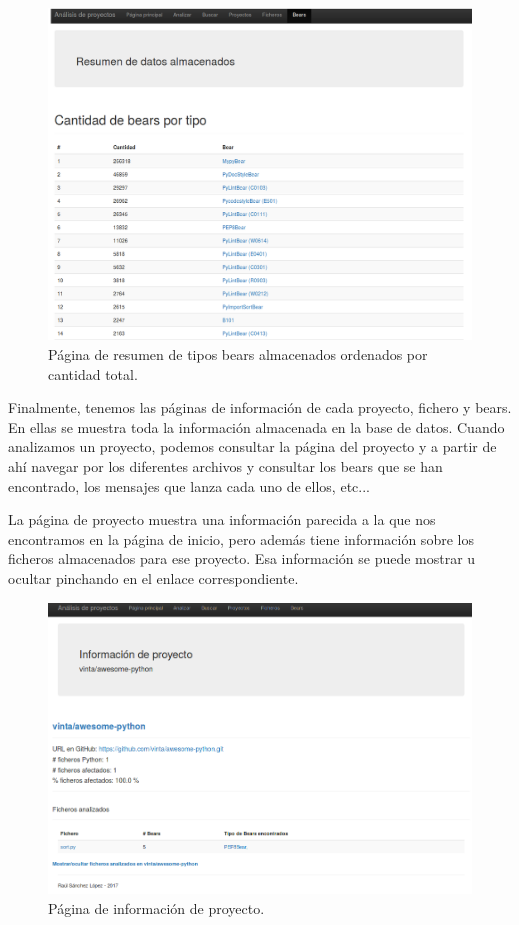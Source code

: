\documentclass[a4paper, 12pt]{book}
\begin{document}
\begin{figure}[h]
  \centering
  \includegraphics[width=12cm, keepaspectratio]{img/resumenBears}
  \caption{Página de resumen de tipos bears almacenados ordenados por cantidad total.}
  \label{fig:resumenBears}
\end{figure}
Finalmente, tenemos las páginas de información de cada proyecto, fichero y bears. En ellas se muestra toda la información almacenada en la base de datos. Cuando analizamos un proyecto, podemos consultar la página del proyecto y a partir de ahí navegar por los diferentes archivos y consultar los bears que se han encontrado, los mensajes que lanza cada uno de ellos, etc...

La página de proyecto muestra una información parecida a la que nos encontramos en la página de inicio, pero además tiene información sobre los ficheros almacenados para ese proyecto. Esa información se puede mostrar u ocultar pinchando en el enlace correspondiente.
\begin{figure}[h]
  \centering
  \includegraphics[width=12cm, keepaspectratio]{img/infoProyecto}
  \caption{Página de información de proyecto.}
  \label{fig:infoProyecto}
\end{figure}
\end{document}
